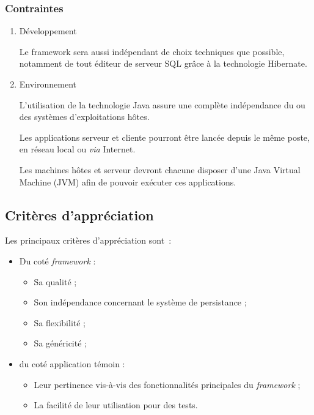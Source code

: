 \subsubsection{Contraintes}
\begin{enumerate}

	\item Développement

Le framework sera aussi indépendant de choix techniques que possible, notamment de tout éditeur de serveur SQL grâce à la technologie Hibernate.

	\item Environnement

L'utilisation de la technologie Java assure une complète indépendance du ou des systèmes d'exploitations hôtes.

Les applications serveur et cliente pourront être lancée depuis le même poste, en réseau local ou \emph{via} Internet.

Les machines hôtes et serveur devront chacune disposer d'une Java Virtual Machine (JVM) afin de pouvoir exécuter ces applications.

\end{enumerate}

\subsection{Critères d’appréciation}

Les principaux critères d'appréciation sont~:

\begin{itemize}
	\item Du coté \emph{framework} :
	\begin{itemize} 
		\item Sa qualité ;
		\item Son indépendance concernant le système de persistance ;
		\item Sa flexibilité ;
		\item Sa généricité ;
	\end{itemize} 
	\item du coté application témoin :
	\begin{itemize}
		\item Leur pertinence vis-à-vis des fonctionnalités principales du \emph{framework} ;
		\item La facilité de leur utilisation pour des tests.
	\end{itemize}
\end{itemize}


